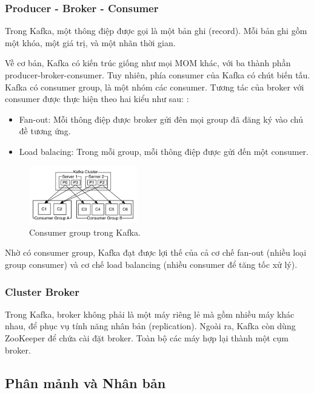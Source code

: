 \documentclass{article}
\begin{document}
\subsubsection{Producer - Broker - Consumer}

Trong Kafka, một thông điệp được gọi là một bản ghi (record). Mỗi bản ghi gồm
một khóa, một giá trị, và một nhãn thời gian.

Về cơ bản, Kafka có kiến trúc giống như mọi MOM khác, với ba thành phần
producer-broker-consumer. Tuy nhiên, phía consumer của Kafka có chút biến tấu.
Kafka có consumer group, là một nhóm các consumer. Tương tác của broker với
consumer được thực hiện theo hai kiểu như sau: \cite{kafka_detail}:

\begin{itemize}
    \item Fan-out: Mỗi thông điệp được broker gửi đên mọi group đã đăng ký vào
    chủ đề tương ứng.
    \item Load balacing: Trong mỗi group, mỗi thông điệp được gửi đến một
    consumer.
\end{itemize}

\begin{figure}
    \centering
    \includegraphics[width=0.42\textwidth]{consumer_groups.png}
    \caption{Consumer group trong Kafka.}
\end{figure}

Nhờ có consumer group, Kafka đạt được lợi thế của cả cơ chế fan-out (nhiều loại
group consumer) và cơ chế load balancing (nhiều consumer để tăng tốc xử lý).

\subsubsection{Cluster Broker}

Trong Kafka, broker không phải là một máy riêng lẻ mà gồm nhiều máy khác nhau,
để phục vụ tính năng nhân bản (replication). Ngoài ra, Kafka còn dùng ZooKeeper
để chứa cài đặt broker. Toàn bộ các máy hợp lại thành một cụm broker.

\subsection{Phân mảnh và Nhân bản}
\end{document}
